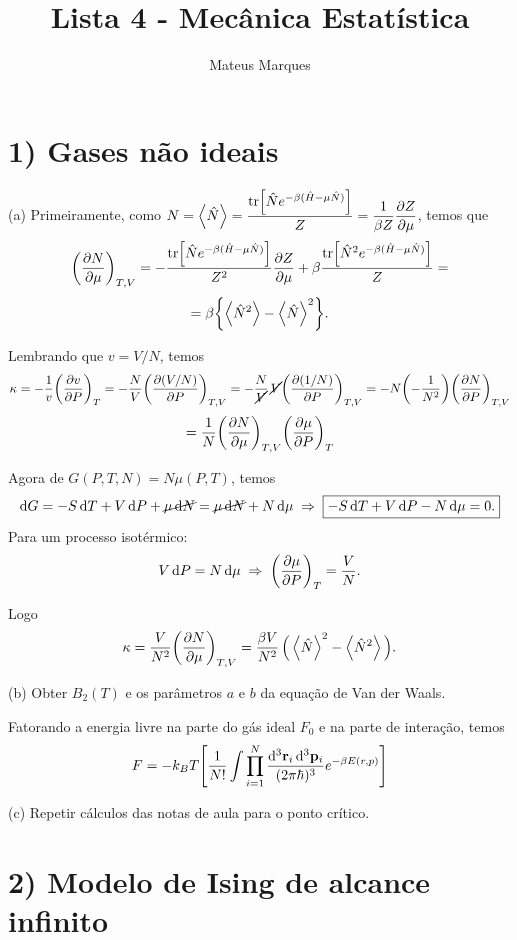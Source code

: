 \documentclass[a4paper,10pt]{article}
\title{\Huge{\textbf{Lista 4 - Mecânica Estatística}}}
\author{Mateus Marques}
\begin{document}
\maketitle

\section*{1) Gases não ideais}

(a) Primeiramente, como $\displaystyle{N = \ev{\hat{N}} = \frac{\tr[\hat{N} e^{-\beta(\hat{H} - \mu \hat{N})}]}{Z} = \frac{1}{\beta Z} \pdv{Z}{\mu}}$, temos que
$$
\qty(\pdv{N}{\mu})_{T,V} = - \frac{\tr[\hat{N} e^{-\beta(\hat{H} - \mu \hat{N})}]}{Z^2} \pdv{Z}{\mu} +
\beta \frac{\tr[\hat{N}^2 e^{-\beta(\hat{H} - \mu \hat{N})}]}{Z} =
$$
$$
= \beta \qty{ \ev{\hat{N}^2} - \ev{\hat{N}}^2 }.
$$


Lembrando que $v = V/N$, temos
$$
\kappa = - \frac{1}{v} \qty(\pdv{v}{P})_{T} = - \frac{N}{V} \qty(\pdv{(V/N)}{P})_{T,V} =
- \frac{N}{\cancel{V}} \, \cancel{V} \qty(\pdv{(1/N)}{P})_{T, V} = -N \qty(-\frac{1}{N^2}) \qty(\pdv{N}{P})_{T,V}
$$
$$
= \frac{1}{N} \qty(\pdv{N}{\mu})_{T,V} \qty(\pdv{\mu}{P})_{T}
$$

Agora de $G(P,T,N) = N \mu(P,T)$, temos
$$
\dd{G} = -S \dd{T} + V \dd{P} + \cancel{\mu \dd{N}} = \cancel{\mu \dd{N}} + N \dd{\mu} \; \Rightarrow \;
\boxed{ -S \dd{T} + V \dd{P} - N \dd{\mu} = 0. }
$$
Para um processo isotérmico:
$$
V \dd{P} = N \dd{\mu} \; \Rightarrow \; \qty(\pdv{\mu}{P})_{T} = \frac{V}{N}.
$$

Logo
$$
\kappa = \frac{V}{N^2} \pdvc{N}{\mu}{T,V} = \frac{\beta V}{N^2} \, \Big(\ev{\hat{N}}^2 - \ev{\hat{N}^2}\Big).
$$

\n\n\n

(b) Obter $B_2(T)$ e os parâmetros $a$ e $b$ da equação de Van der Waals.

Fatorando a energia livre na parte do gás ideal $F_0$ e na parte de interação, temos
$$
F = - k_B T \qty[
\frac{1}{N!} \int \prod_{i=1}^N \frac{\dd[3]{\vb{r}_i} \dd[3]{\vb{p}_i}}{(2\pi \hbar)^3} e^{-\beta E(r,p)}
]
$$



(c) Repetir cálculos das notas de aula para o ponto crítico.


\pagebreak

\section*{2) Modelo de Ising de alcance infinito}



\pagebreak
\end{document}
